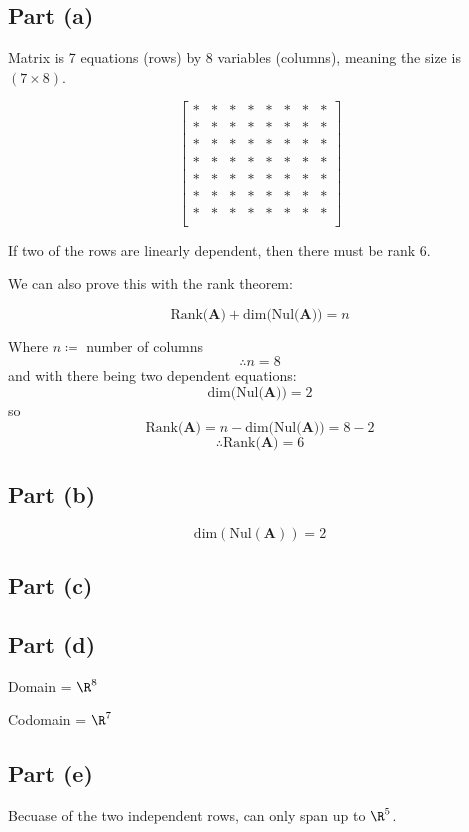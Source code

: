 \documentclass{article}
\begin{document}
\subsection{Part (a)} 
Matrix is 7 equations (rows) by 8 variables (columns), meaning the size is
$(7 \times 8)$.


\[%
    \begin{bmatrix} 
        * & * & * & * & * & * & * & * \\
        * & * & * & * & * & * & * & * \\
        * & * & * & * & * & * & * & * \\
        * & * & * & * & * & * & * & * \\
        * & * & * & * & * & * & * & * \\
        * & * & * & * & * & * & * & * \\
        * & * & * & * & * & * & * & * \\
    \end{bmatrix}
\]%

If two of the rows are linearly dependent, then there must be rank 6.


We can also prove this with the rank theorem:

\[%
    \text{Rank(}\mathbf{A}) + \text{dim(Nul(}\mathbf{A})) = n
\]%

Where $ n \coloneqq  $ number of columns
\[%
    \therefore n=8
\]%
and with there being two dependent equations:
\[%
   \text{dim(Nul(}\mathbf{A})) = 2
\]%
so
\[%
    \text{Rank(}\mathbf{A})  = n  - \text{dim(Nul(}\mathbf{A})) = 8 - 2 
\]%
\[%
    \therefore \text{Rank(}\mathbf{A}) = 6
\]%

\subsection{Part (b)} 
\[%
    \text{dim} (\text{Nul}(\mathbf{A})) = 2
\]%


\subsection{Part (c)} 


\subsection{Part (d)} 
Domain = $ \R^{8} $ 

Codomain = $ \R^{7} $

\subsection{Part (e)} 
Becuase of the two independent rows, can only span up to $ \R^{5} $.
\end{document}
